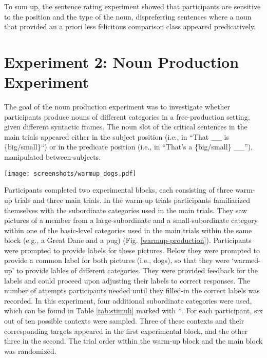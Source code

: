 To sum up, the sentence rating experiment showed that participants are sensitive to the position and the type of the noun, dispreferring sentences where a noun that provided an a priori less felicitous comparison class appeared predicatively.  

\section{Experiment 2: Noun Production Experiment}    


The goal of the noun production experiment was to investigate whether participants produce nouns of different categories in a free-production setting, given different syntactic frames.  The noun slot of the critical sentences in the main trials appeared either in the subject position (i.e., in “That \_\_ is \{big/small\}“) or in the predicate position (i.e., in “That’s a \{big/small\} \_\_”), manipulated between-subjects. 

\begin{figure*}[t]
	\begin{center}
		\texttt{[image: screenshots/warmup\_dogs.pdf]}
	\end{center}
	\vspace{-2cm}
	\caption{Example view of the noun production warm-up trial: Participants have to label a large-subordinate (Great Dane, right) and a small-subordinate target (pug, left) for the dogs-category, and provide the common label below.}
	\label{warmup-production}
\end{figure*}
Participants completed two experimental blocks, each consisting of three warm-up trials and three main trials. In the warm-up trials participants familiarized themselves with the subordinate categories used in the main trials. They saw pictures of a member from a large-subordinate and a small-subordinate category within one of the basic-level categories used in the main trials within the same block (e.g., a Great Dane and a pug) (Fig. \ref{warmup-production}). Participants were prompted to provide labels for these pictures. Below they were prompted to provide a common label for both pictures (i.e., dogs), so that they were `warmed-up' to provide lables of different categories. They were provided feedback for the labels and could proceed upon adjusting their labels to correct responses. The number of attempts participants needed until they filled-in the correct labels was recorded. In this experiment, four additional subordinate categories were used, which can be found in Table \ref{tab:stimuli} marked with *. For each participant, six out of ten possible contexts were sampled. Three of these contexts and their corresponding targets appeared in the first experimental block, and the other three in the second. The trial order within the warm-up block and the main block was randomized. 

